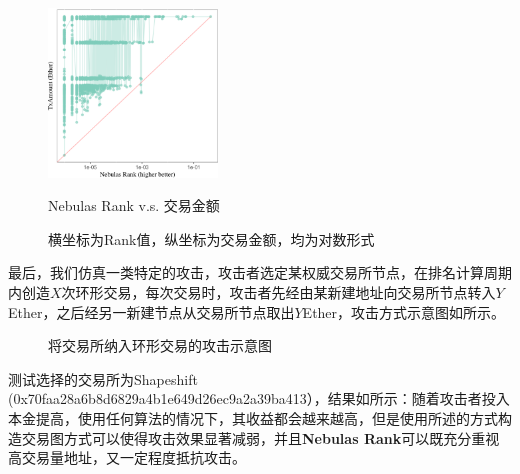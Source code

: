 \begin{figure}[!htbp]
	\centering
	\includegraphics[width=0.40\textwidth]{figs/MAY_lr.png}
	\caption{Nebulas Rank v.s. 交易金额}\label{fig:nrio}
	\caption*{\footnotesize{横坐标为Rank值，纵坐标为交易金额，均为对数形式}}
\end{figure}


最后，我们仿真一类特定的攻击，攻击者选定某权威交易所节点，在排名计算周期内创造$X$次环形交易，每次交易时，攻击者先经由某新建地址向交易所节点转入$Y$Ether，之后经另一新建节点从交易所节点取出$Y$Ether，攻击方式示意图如所示。

\begin{figure}[!htbp]
	\centering
  
	\caption{将交易所纳入环形交易的攻击示意图}\label{fig:loop}
\end{figure}

测试选择的交易所为Shapeshift (0x70faa28a6b8d6829a4b1e649d26ec9a2a39ba413），结果如所示：随着攻击者投入本金提高，使用任何算法的情况下，其收益都会越来越高，但是使用所述的方式构造交易图方式可以使得攻击效果显著减弱，并且\textbf{Nebulas Rank}可以既充分重视高交易量地址，又一定程度抵抗攻击。

